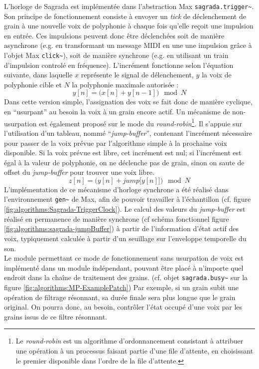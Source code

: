 \noindent L'horloge de Sagrada est implémentée dans l'abstraction Max \verb|sagrada.trigger~|. Son principe de fonctionnement consiste à envoyer un \textit{tick} de déclenchement de grain à une nouvelle voix de polyphonie à chaque fois qu'elle reçoit une impulsion en entrée. Ces impulsions peuvent donc être déclenchées soit de manière asynchrone (e.g. en transformant un message \gls{MIDI} en une une impulsion grâce à l'objet Max \verb|click~|), soit de manière synchrone (e.g. en utilisant un train d'impulsion controlé en fréquence). L'incrément fonctionne selon l'équation suivante, dans laquelle $x$ représente le signal de délenchement, $y$ la voix de polyphonie cible et $N$ la polyphonie maximale autorisée :
$$ y[n] = \big(x[n] + y[n - 1]\big) \mod N $$
\noindent Dans cette version simple, l'assignation des voix se fait donc de manière cyclique, en ``usurpant'' au besoin la voix à un grain encore actif. Un mécanisme de non-usurpation est également proposé sur le mode du \textit{round-robin}\footnote{Le \textit{round-robin} est un algorithme d'ordonnancement consistant à attribuer une opération à un processus faisant partie d'une file d'attente, en choisissant le premier disponible dans l'ordre de la file d'attente.}. Il s'appuie sur l'utilisation d'un tableau, nommé ``\textit{jump-buffer}'', contenant l'incrément nécessaire pour passer de la voix prévue par l'algorithme simple à la prochaine voix disponible. Si la voix prévue est libre, cet incrément est nul; si l'incrément est égal à la valeur de polyphonie, on ne déclenche pas de grain, sinon on saute de offset du \textit{jump-buffer }pour trouver une voix libre.
$$ z[n] = \Big(y[n] + jump\big[y[n]\big]\Big)\mod N $$
\noindent L'implémentation de ce mécanisme d'horloge synchrone a été réalisé dans l'environnement \verb|gen~| de Max, afin de pouvoir travailler à l'échantillon (cf. figure \ref{fig:algorithms:Sagrada-TriggerClock}). Le calcul des valeurs du \textit{jump-buffer} est réalisé en permanence de manière synchrone (cf schéma fonctionnel figure \ref{fig:algorithms:sagrada-jumpBuffer}) à partir de l'information d'état actif des voix, typiquement calculée à partir d'un seuillage sur l'enveloppe temporelle du son.\\
\indent Le module permettant ce mode de fonctionnement sans usurpation de voix est implémenté dans un module indépendant, pouvant être placé à n'importe quel endroit dans la chaîne de traitement des grains. (cf. objet \verb|sagrada.busy~| sur la figure \ref{fig:algorithms:MP-ExamplePatch}) Par exemple, si un grain subit une opération de filtrage résonnant, sa durée finale sera plus longue que le grain original. On pourra donc, au besoin, contrôler l'état occupé d'une voix par les grains issus de ce filtre résonnant.

